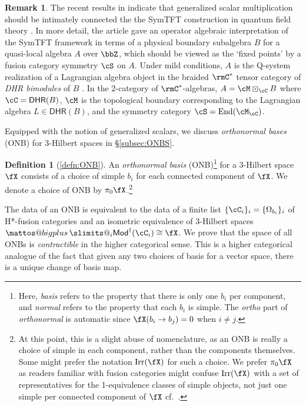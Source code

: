 \documentclass[12pt, reqno]{amsart}
\makeatletter
\DeclareMathOperator{\End}{End}
\newcommand{\Mod}{\mathsf{Mod}}
\theoremstyle{plain}
\theoremstyle{definition}
\newtheorem{defnalpha}[thmalpha]{Definition}
\newtheorem{rem}[thm]{Remark}
\newcommand{\bigboxplus}{%
  \DOTSB\mathop{\mathpalette\mattos@bigplus\relax}\slimits@
}
\newcommand\mattos@bigplus[2]{%
  \vcenter{\hbox{%
    \sbox\z@{$#1\sum$}%
    \resizebox{!}{0.9\dimexpr\ht\z@+\dp\z@}{\raisebox{\depth}{$\m@th#1\boxplus$}}%
  }}%
  \vphantom{\sum}%
}
\makeatother
\begin{document}
\begin{rem}
The recent results in \cite{2507.05185} indicate that generalized scalar multiplication should be intimately connected the the SymTFT construction in quantum field theory \cite{1702.00673,MR4814695}.
In more detail, the article \cite{2507.05185} gave an operator algebraic interpretation of the SymTFT framework in terms of a physical boundary subalgebra $B$ for a quasi-local algebra $A$ over $\bbZ$, which should be viewed as the `fixed points' by a fusion category symmetry $\cS$ on $A$.
Under mild conditions, $A$ is the Q-system realization of a Lagrangian algebra object in the braided $\rmC^*$ tensor category of \emph{DHR bimodules} of $B$ \cite{MR4814692}.
In the 2-category of $\rmC^*$-algebras, $A=\cM\boxdot_\cC B$ where $\cC=\mathsf{DHR}(B)$, $\cM$ is the topological boundary corresponding to the Lagrangian algebra $L\in \mathsf{DHR}(B)$, and the symmetry category $\cS=\End(\cM_\cC)$.
\end{rem}

Equipped with the notion of generalized scalars, we discuss \emph{orthonormal bases} (ONB) for 3-Hilbert spaces in \S\ref{subsec:ONBS}. 

\begin{defnalpha}[\ref{defn:ONB}]
An \emph{orthonormal basis} (ONB)\footnote{\label{Footnote:ONB}Here, \emph{basis} refers to the property that there is only one $b_i$ per component, and \emph{normal} refers to the property that each $b_i$ is simple.
The \emph{ortho} part of \emph{orthonormal} is automatic since $\fX(b_i\to b_j)=0$ when $i\neq j$.} for a 3-Hilbert space $\fX$ consists of a choice of simple $b_i$ for each connected component of $\fX$. 
We denote a choice of ONB by $\pi_0\fX$.\footnote{At this point, this is a slight abuse of nomenclature, as an ONB is really a choice of simple in each component, rather than the components themselves.
Some might prefer the notation $\operatorname{Irr}(\fX)$ for such a choice.
We prefer $\pi_0\fX$ as readers familiar with fusion categories might confuse $\operatorname{Irr}(\fX)$ with a set of representatives for the 1-equivalence classes of simple objects, not just one simple per connected component of $\fX$ cf.~\cite[Def.~1.2.22]{1812.11933}.
} 
\end{defnalpha}

The data of an ONB is equivalent to the data of a finite list $\{\cC_i\}_i = \{\Omega_{b_i}\}_i$ of H*-fusion categories and an isometric equivalence of 3-Hilbert spaces $\bigboxplus_i \Mod^\dag(\cC_i) \cong \fX$.
We prove that the space of all ONBs is \emph{contractible} in the higher categorical sense.
This is a higher categorical analogue of the fact that given any two choices of basis for a vector space, there is a unique change of basis map.
\end{document}
